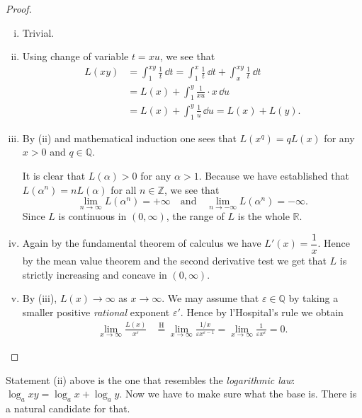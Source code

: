 \begin{proof}
  \begin{enumerate}[(i)]
    \item Trivial.

    \item Using change of variable $t = xu$, we see that
      \begin{align*}
	L(xy) &= \int_1^{xy} \frac{1}{t} \, \dd t = \int_1^x \frac{1}{t} \, \dd t + \int_x^{xy} \frac{1}{t} \, \dd t \\
	&= L(x) + \int_1^y \frac{1}{xu} \cdot x \, \dd u\\
	&= L(x) + \int_1^y \frac{1}{u} \, \dd u = L(x) + L(y).
      \end{align*}

    \item By (ii) and mathematical induction one sees that $L(x^q) = q L(x)$ for any $x > 0$ and $q \in \mathbb{Q}$.

      It is clear that $L(\alpha) > 0$ for any $\alpha > 1$.
      Because we have established that $L(\alpha^n) = n L(\alpha)$ for all $n \in \mathbb{Z}$, we see that
      \[
	\lim_{n\to\infty} L(\alpha^n) = +\infty \quad \text{and} \quad
	\lim_{n\to-\infty} L(\alpha^n) = -\infty.
      \]
      Since $L$ is continuous in $(0,\infty)$, the range of $L$ is the whole $\mathbb{R}$.
      
    \item Again by the fundamental theorem of calculus we have $L'(x) = \dfrac1x$.
      Hence by the mean value theorem and the second derivative test we get that $L$ is strictly increasing and concave in $(0,\infty)$.

    \item By (iii), $L(x) \to \infty$ as $x \to \infty$.  We may assume that $\varepsilon \in \mathbb{Q}$ by taking a smaller positive {\em rational} exponent $\varepsilon'$.
      Hence by l'Hospital's rule we obtain
      \begin{align*}
	\lim_{x\to\infty} \frac{L(x)}{x^\varepsilon} &\stackrel{\text{H}}{=} \lim_{x\to\infty} \frac{1/x}{\varepsilon x^{\varepsilon - 1}} = \lim_{x\to\infty} \frac{1}{\varepsilon x^{\varepsilon}} = 0.
      \end{align*}
  \end{enumerate}
\end{proof}

Statement (ii) above is the one that resembles the \textit{logarithmic law}: $\log_a xy = \log_a x + \log_a y$.  Now we have to make sure what the base is.  There is a natural candidate for that.

